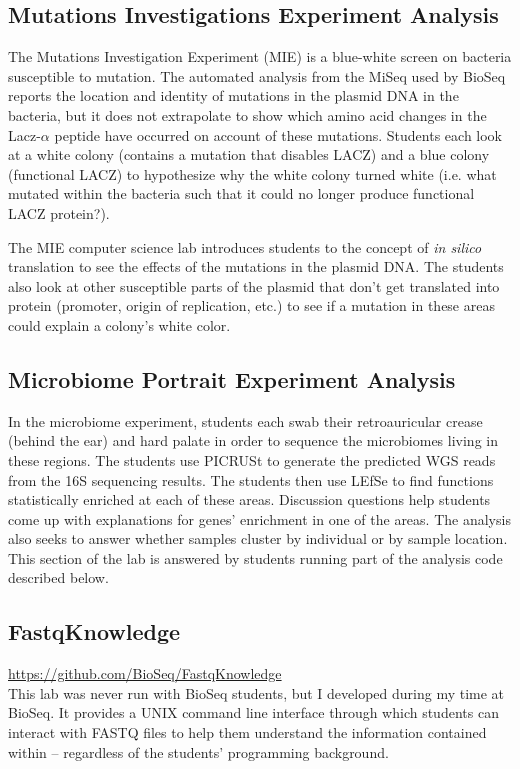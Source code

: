 \documentclass{report}
\begin{document}
\subsection{Mutations Investigations Experiment Analysis}
The Mutations Investigation Experiment (MIE) is a blue-white screen on bacteria susceptible to mutation. The automated analysis from the MiSeq used by BioSeq reports the location and identity of mutations in the plasmid DNA in the bacteria, but it does not extrapolate to show which amino acid changes in the Lacz-$\alpha$ peptide have occurred on account of these mutations. Students each look at a white colony (contains a mutation that disables LACZ) and a blue colony (functional LACZ) to hypothesize why the white colony turned white (i.e. what mutated within the bacteria such that it could no longer produce functional LACZ protein?).

The MIE computer science lab introduces students to the concept of \emph{in silico} translation to see the effects of the mutations in the plasmid DNA. The students also look at other susceptible parts of the plasmid that don't get translated into protein (promoter, origin of replication, etc.) to see if a mutation in these areas could explain a colony's white color.

\subsection{Microbiome Portrait Experiment Analysis}
In the microbiome experiment, students each swab their retroauricular crease (behind the ear) and hard palate in order to sequence the microbiomes living in these regions. The students use PICRUSt to generate the predicted WGS reads from the 16S sequencing results. The students then use LEfSe \cite{segata2011metagenomic} to find functions statistically enriched at each of these areas. Discussion questions help students come up with explanations for genes' enrichment in one of the areas. The analysis also seeks to answer whether samples cluster by individual or by sample location. This section of the lab is answered by students running part of the analysis code described below.

\subsection{FastqKnowledge}
\url{https://github.com/BioSeq/FastqKnowledge}\\

\noindent This lab was never run with BioSeq students, but I developed during my time at BioSeq. It provides a UNIX command line interface through which students can interact with FASTQ files to help them understand the information contained within -- regardless of the students' programming background.
\end{document}
